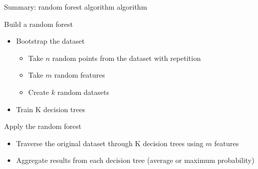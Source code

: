\documentclass[handout, 10pt]{beamer}
\begin{document}
\begin{frame}{Summary: random forest algorithm algorithm}
\begin{block}{Build a random forest}
\begin{itemize}
    \item Bootstrap the dataset
    \begin{itemize}
        \item Take $n$ random points from the dataset with repetition
        \item Take $m$ random features
        \item Create $k$ random datasets
    \end{itemize}
    \item Train K decision trees
\end{itemize}
\end{block}
\pause
\begin{block}{Apply the random forest}
\begin{itemize}
    \item Traverse the original dataset through K decision trees using $m$ features
    \item Aggregate results from each decision tree (average or maximum probability)
\end{itemize}
\end{block}
\end{frame}
\end{document}
